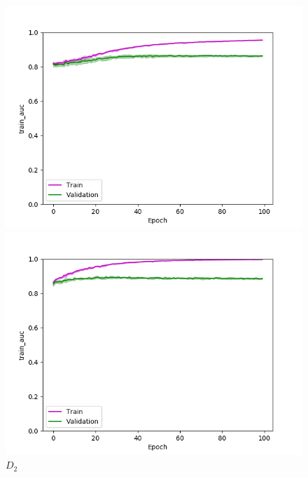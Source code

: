 \def\year{2017}\relax \documentclass[letterpaper]{article}
\begin{document}
\begin{figure}
\centering
\begin{minipage}{.24\textwidth}
  \centering
\includegraphics[width=\textwidth]{pics/d1_train_auc_mean_train_test.png}
\caption{$D_1$}\label{fig:d1acctraintest}
\end{minipage}
\begin{minipage}{.01\textwidth}
\end{minipage}
\begin{minipage}{.24\textwidth}
  \centering
\includegraphics[width=\textwidth]{pics/d2_train_auc_mean_train_test.png}
\caption{$D_2$}\label{fig:d2acctraintest}
\end{minipage}
\begin{minipage}{.24\textwidth}

\end{minipage}
\end{figure}
\end{document}
